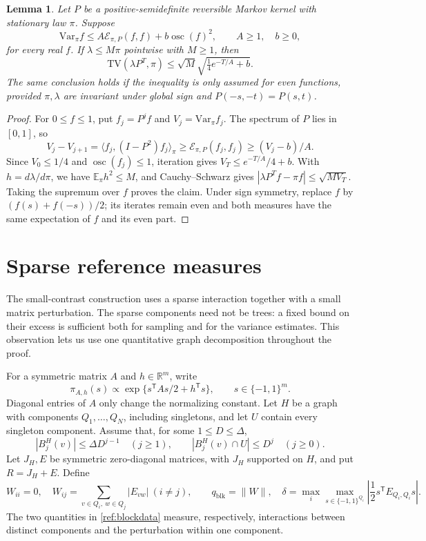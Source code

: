 \documentclass[11pt]{article}
\newcommand{\TV}{\mathrm{TV}}
\newcommand{\Var}{\mathrm{Var}}
\def\E{\mathbb{E}}
\def\R{\mathbb{R}}
\newtheorem{lemma}[thm]{Lemma}
\numberwithin{equation}{section}
\begin{document}
\begin{lemma}\label{fd:weak}
Let $P$ be a positive-semidefinite reversible Markov kernel with stationary law $\pi$. Suppose
\[
 \Var_\pi f\le A\mathcal E_{\pi,P}(f,f)+b\operatorname{osc}(f)^2,
 \qquad A\ge1,\quad b\ge0,
\]
for every real $f$. If $\lambda\le M\pi$ pointwise with $M\ge1$, then
\[
 \TV(\lambda P^T,\pi)\le\sqrt{M}\sqrt{\tfrac14e^{-T/A}+b}.
\]
The same conclusion holds if the inequality is only assumed for even functions, provided $\pi,\lambda$ are invariant under global sign and $P(-s,-t)=P(s,t)$.
\end{lemma}

\begin{proof}
For $0\le f\le1$, put $f_j=P^jf$ and $V_j=\Var_\pi f_j$. The spectrum of $P$ lies in $[0,1]$, so
\[
 V_j-V_{j+1}=\langle f_j,(I-P^2)f_j\rangle_\pi
 \ge\mathcal E_{\pi,P}(f_j,f_j)\ge(V_j-b)/A.
\]
Since $V_0\le1/4$ and $\operatorname{osc}(f_j)\le1$, iteration gives
$V_T\le e^{-T/A}/4+b$. With $h=d\lambda/d\pi$, we have $\E_\pi h^2\le M$, and Cauchy--Schwarz gives
$|\lambda P^Tf-\pi f|\le\sqrt{M V_T}$. Taking the supremum over $f$ proves the claim. Under sign symmetry, replace $f$ by $(f(s)+f(-s))/2$; its iterates remain even and both measures have the same expectation of $f$ and its even part.
\end{proof}


\section{Sparse reference measures}\label{sec:reference}

The small-contrast construction uses a sparse interaction together with a small matrix perturbation. The sparse components need not be trees: a fixed bound on their excess is sufficient both for sampling and for the variance estimates. This observation lets us use one quantitative graph decomposition throughout the proof.

For a symmetric matrix $A$ and $h\in\R^m$, write
\[
 \pi_{A,h}(s)\propto\exp\{s^{\mathsf T}As/2+h^{\mathsf T}s\},
 \qquad s\in\{-1,1\}^m.
\]
Diagonal entries of $A$ only change the normalizing constant. Let $H$ be a graph with components $Q_1,\ldots,Q_N$, including singletons, and let $U$ contain every singleton component. Assume that, for some $1\le D\le\Delta$,
\begin{equation}\label{ref:growth}
 |B_j^H(v)|\le\Delta D^{j-1}\quad(j\ge1),\qquad
 |B_j^H(v)\cap U|\le D^j\quad(j\ge0).
\end{equation}
Let $J_H,E$ be symmetric zero-diagonal matrices, with $J_H$ supported on $H$, and put $R=J_H+E$. Define
\begin{equation}\label{ref:blockdata}
 W_{ii}=0,\quad W_{ij}=\sum_{v\in Q_i,\ w\in Q_j}|E_{vw}|\ (i\ne j),\qquad
 q_{\mathrm{blk}}=\|W\|,\quad
 \delta=\max_i\max_{s\in\{-1,1\}^{Q_i}}
       \left|\frac12s^{\mathsf T}E_{Q_i,Q_i}s\right|.
\end{equation}
The two quantities in \eqref{ref:blockdata} measure, respectively, interactions between distinct components and the perturbation within one component.
\end{document}
